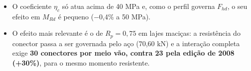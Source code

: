 \begin{itemize}
\item O coeficiente $\eta_c$ só atua acima de 40 MPa e, como o perfil governa $F_{hd}$, o seu efeito em $M_{Rd}$ é pequeno (\ensuremath{-}0,4\% a 50 MPa).
\item O efeito mais relevante é o de $R_p = 0{,}75$ em lajes maciças: a resistência do conector passa a ser governada pelo aço (70,60 kN) e a interação completa exige \textbf{30 conectores por meio vão, contra 23 pela edição de 2008 (+30\%)}, para o mesmo momento resistente.
\end{itemize}
